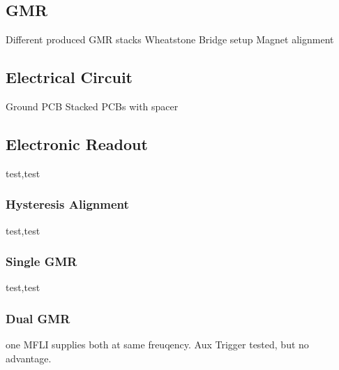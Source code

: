 \subsection{GMR}
Different produced GMR stacks
Wheatstone Bridge setup
Magnet alignment
\subsection{Electrical Circuit}
Ground
PCB
Stacked PCBs with spacer
\subsection{Electronic Readout}
test,test
\subsubsection{Hysteresis Alignment}
test,test
\subsubsection{Single GMR}
test,test
\subsubsection{Dual GMR}
one MFLI supplies both at same freuqency. Aux Trigger tested, but no advantage.



